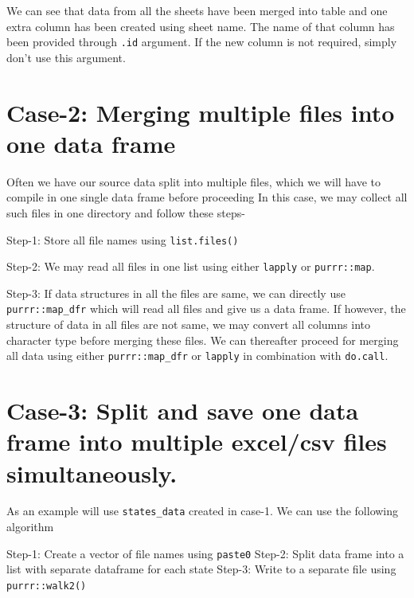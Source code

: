 \documentclass[
]{book}
\begin{document}
We can see that data from all the sheets have been merged into table and one extra column has been created using sheet name. The name of that column has been provided through \texttt{.id} argument. If the new column is not required, simply don't use this argument.

\hypertarget{case-2-merging-multiple-files-into-one-data-frame}{%
\section{\texorpdfstring{\textbf{Case-2}: Merging multiple files into one data frame}{Case-2: Merging multiple files into one data frame}}\label{case-2-merging-multiple-files-into-one-data-frame}}

Often we have our source data split into multiple files, which we will have to compile in one single data frame before proceeding In this case, we may collect all such files in one directory and follow these steps-

Step-1: Store all file names using \texttt{list.files()}

Step-2: We may read all files in one list using either \texttt{lapply} or \texttt{purrr::map}.

Step-3: If data structures in all the files are same, we can directly use \texttt{purrr::map\_dfr} which will read all files and give us a data frame. If however, the structure of data in all files are not same, we may convert all columns into character type before merging these files. We can thereafter proceed for merging all data using either \texttt{purrr::map\_dfr} or \texttt{lapply} in combination with \texttt{do.call}.

\hypertarget{case-3-split-and-save-one-data-frame-into-multiple-excelcsv-files-simultaneously.}{%
\section{\texorpdfstring{\textbf{Case-3}: Split and save one data frame into multiple excel/csv files simultaneously.}{Case-3: Split and save one data frame into multiple excel/csv files simultaneously.}}\label{case-3-split-and-save-one-data-frame-into-multiple-excelcsv-files-simultaneously.}}

As an example will use \texttt{states\_data} created in case-1. We can use the following algorithm

Step-1: Create a vector of file names using \texttt{paste0}
Step-2: Split data frame into a list with separate dataframe for each state
Step-3: Write to a separate file using \texttt{purrr::walk2()}
\end{document}
